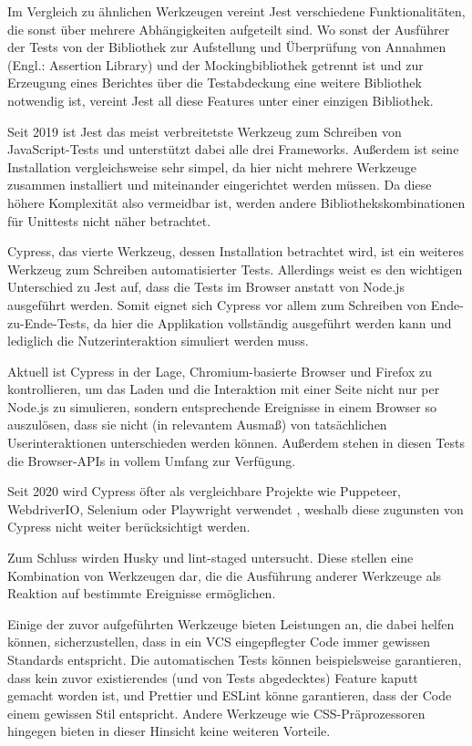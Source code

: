 Im Vergleich zu ähnlichen Werkzeugen vereint Jest verschiedene Funktionalitäten, die sonst über mehrere Abhängigkeiten aufgeteilt sind. Wo sonst der Ausführer der Tests von der Bibliothek zur Aufstellung und Überprüfung von Annahmen (Engl.: \glqq Assertion Library\grqq) und der Mockingbibliothek getrennt ist und zur Erzeugung eines Berichtes über die Testabdeckung eine weitere Bibliothek notwendig ist, vereint Jest all diese Features unter einer einzigen Bibliothek.

Seit 2019 ist Jest das meist verbreitetste Werkzeug zum Schreiben von JavaScript-Tests \cite{stateofjs} und unterstützt dabei alle drei Frameworks. Außerdem ist seine Installation vergleichsweise sehr simpel, da hier nicht mehrere Werkzeuge zusammen installiert und miteinander eingerichtet werden müssen. Da diese höhere Komplexität also vermeidbar ist, werden andere Bibliothekskombinationen für Unittests nicht näher betrachtet.

Cypress, das vierte Werkzeug, dessen Installation betrachtet wird, ist ein weiteres Werkzeug zum Schreiben automatisierter Tests. Allerdings weist es den wichtigen Unterschied zu Jest auf, dass die Tests im Browser anstatt von Node.js ausgeführt werden. Somit eignet sich Cypress vor allem zum Schreiben von Ende-zu-Ende-Tests, da hier die Applikation vollständig ausgeführt werden kann und lediglich die Nutzerinteraktion simuliert werden muss.

Aktuell ist Cypress in der Lage, Chromium-basierte Browser und Firefox zu kontrollieren, um das Laden und die Interaktion mit einer Seite nicht nur per Node.js zu simulieren, sondern entsprechende Ereignisse in einem Browser so auszulösen, dass sie nicht (in relevantem Ausmaß) von tatsächlichen Userinteraktionen unterschieden werden können. Außerdem stehen in diesen Tests die Browser-APIs in vollem Umfang zur Verfügung.

Seit 2020 wird Cypress öfter als vergleichbare Projekte wie Puppeteer, WebdriverIO, Selenium oder Playwright verwendet \cite{stateofjs}, weshalb diese zugunsten von Cypress nicht weiter berücksichtigt werden.

Zum Schluss wirden Husky und lint-staged untersucht. Diese stellen eine Kombination von Werkzeugen dar, die die Ausführung anderer Werkzeuge als Reaktion auf bestimmte Ereignisse ermöglichen.

Einige der zuvor aufgeführten Werkzeuge bieten Leistungen an, die dabei helfen können, sicherzustellen, dass in ein \gls{VCS} eingepflegter Code immer gewissen Standards entspricht. Die automatischen Tests können beispielsweise garantieren, dass kein zuvor existierendes (und von Tests abgedecktes) Feature kaputt gemacht worden ist, und Prettier und ESLint könne garantieren, dass der Code einem gewissen Stil entspricht. Andere Werkzeuge wie CSS-Präprozessoren hingegen bieten in dieser Hinsicht keine weiteren Vorteile.

